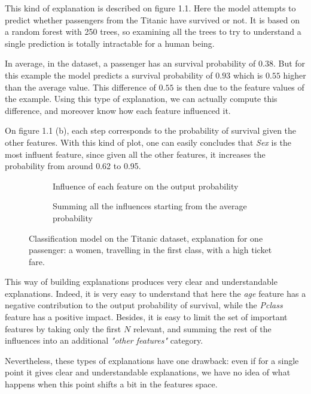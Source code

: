 \documentclass[a4paper,11pt]{kth-mag}
\begin{document}
This kind of explanation is described on figure 1.1. Here the model attempts to predict whether passengers from the Titanic have survived or not. It is based on a random forest with 250 trees, so examining all the trees to try to understand a single prediction is totally intractable for a human being.

In average, in the dataset, a passenger has an survival probability of $0.38$. But for this example the model predicts a survival probability of $0.93$ which is $0.55$ higher than the average value. This difference of $0.55$ is then due to the feature values of the example. Using this type of explanation, we can actually compute this difference, and moreover know how each feature influenced it. 

On figure 1.1 (b), each step corresponds to the probability of survival given the other features. With this kind of plot, one can easily concludes that \textit{Sex} is the most influent feature, since given all the other features, it increases the probability from around 0.62 to 0.95.

\begin{figure}
	\begin{subfigure}{1.\textwidth}
    	\centering
    	\def\svgwidth{\columnwidth}
    	
    	\caption{Influence of each feature on the output probability}
    \end{subfigure}
	\begin{subfigure}{1.\textwidth}
    	\centering
    	\def\svgwidth{\columnwidth}
    	
    	\caption{Summing all the influences starting from the average probability}
    \end{subfigure}
    \caption{Classification model on the Titanic dataset, explanation for one passenger: a women, travelling in the first class, with a high ticket fare.}
\end{figure}

This way of building explanations produces very clear and understandable explanations. Indeed, it is very easy to understand that here the \textit{age} feature has a negative contribution to the output probability of survival, while the \textit{Pclass} feature has a positive impact. Besides, it is easy to limit the set of important features by taking only the first $N$ relevant, and summing the rest of the influences into an additional \textit{"other features"} category.

Nevertheless, these types of explanations have one drawback: even if for a single point it gives clear and understandable explanations, we have no idea of what happens when this point shifts a bit in the features space.
\end{document}
